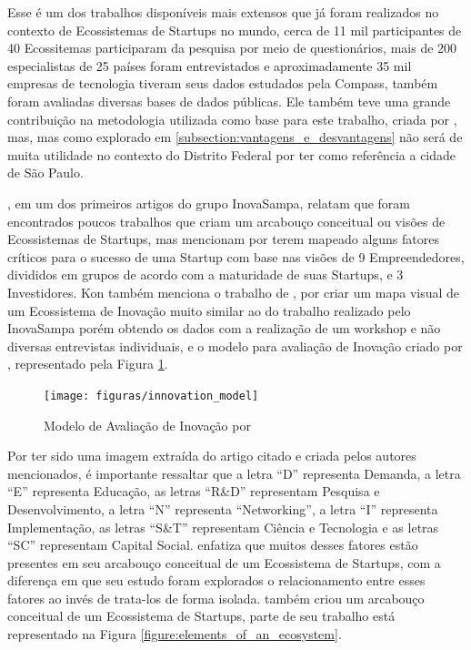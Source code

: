 Esse é um dos trabalhos disponíveis mais extensos que já foram realizados no contexto de Ecossistemas de Startups no mundo, cerca de 11 mil participantes de 40 Ecossitemas participaram da pesquisa por meio de questionários, mais de 200 especialistas de 25 países foram entrevistados e aproximadamente 35 mil empresas de tecnologia tiveram seus dados estudados pela Compass, também foram avaliadas diversas bases de dados públicas. Ele também teve uma grande contribuição na metodologia utilizada como base para este trabalho, criada por , mas, mas como explorado em \ref{subsection:vantagens_e_desvantagens} não será de muita utilidade no contexto do Distrito Federal por ter como referência a cidade de São Paulo.

, em um dos primeiros artigos do grupo InovaSampa, relatam que foram encontrados poucos trabalhos que criam um arcabouço conceitual ou visões de Ecossistemas de Startups, mas mencionam  por terem mapeado alguns fatores críticos para o sucesso de uma Startup com base nas visões de 9 Empreendedores, divididos em grupos de acordo com a maturidade de suas Startups, e 3 Investidores. Kon também menciona o trabalho de , por criar um mapa visual de um Ecossistema de Inovação muito similar ao do trabalho realizado pelo InovaSampa porém obtendo os dados com a realização de um workshop e não diversas entrevistas individuais, e o modelo para avaliação de Inovação criado por , representado pela Figura \ref{figure:innovation_model}. 

\begin{figure}[!htb]
\centering
\texttt{[image: figuras/innovation\_model]}
\caption{Modelo de Avaliação de Inovação por }
\label{figure:innovation_model}
\end{figure}

Por ter sido uma imagem extraída do artigo citado e criada pelos autores mencionados, é importante ressaltar que a letra ``D'' representa Demanda, a letra ``E'' representa Educação, as letras ``R\&D'' representam Pesquisa e Desenvolvimento, a letra ``N'' representa ``Networking'', a letra ``I'' representa Implementação, as letras ``S\&T'' representam Ciência e Tecnologia e as letras ``SC'' representam Capital Social.  enfatiza que muitos desses fatores estão presentes em seu arcabouço conceitual de um Ecossistema de Startups, com a diferença em que seu estudo foram explorados o relacionamento entre esses fatores ao invés de trata-los de forma isolada.  também criou um arcabouço conceitual de um Ecossistema de Startups, parte de seu trabalho está representado na Figura \ref{figure:elements_of_an_ecosystem}.

